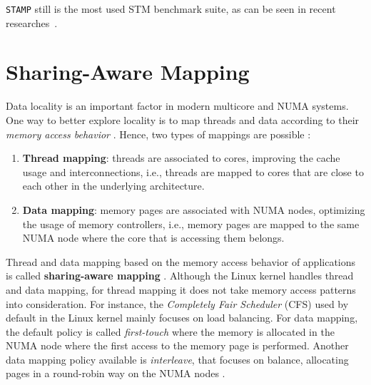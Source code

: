 


\texttt{STAMP} still is the most used STM benchmark suite, as can be seen in recent researches~\cite{Chen:2020, Carvalho:2020, Sanzo:2020, Yu:2019, Poudel:2019, Mururu:2019}.


\section{Sharing-Aware Mapping}\label{sect:sharing-aware}

Data locality is an important factor in modern multicore and NUMA systems. One way to better explore locality is to map threads and data according to their \emph{memory access behavior} \cite{Diener:2016Sur}. Hence, two types of mappings are possible \cite{Cruz:2018}:
\begin{enumerate}
	 \item \textbf{Thread mapping}: threads are associated to cores, improving the cache usage and interconnections, i.e., threads are mapped to cores that are close to each other in the underlying architecture.

	\item \textbf{Data mapping}: memory pages are associated with NUMA nodes, optimizing the usage of memory controllers, i.e., memory pages are mapped to the same NUMA node where the core that is accessing them belongs.
\end{enumerate}

Thread and data mapping based on the memory access behavior of applications is called \textbf{sharing-aware mapping} \cite{Cruz:2018}. Although the Linux kernel handles thread and data mapping, for thread mapping it does not take memory access patterns into consideration. For instance, the \emph{Completely Fair Scheduler} (CFS) \cite{Wong:2008} used by default in the Linux kernel \cite{Diener:2016Sur} mainly focuses on load balancing. For data mapping, the default policy is called \emph{first-touch} \cite{Gaud:2015} where the memory is allocated in the NUMA node where the first access to the memory page is performed. Another data mapping policy available is \emph{interleave}, that focuses on balance, allocating pages in a round-robin way on the NUMA nodes \cite{Lameter:2013}.

